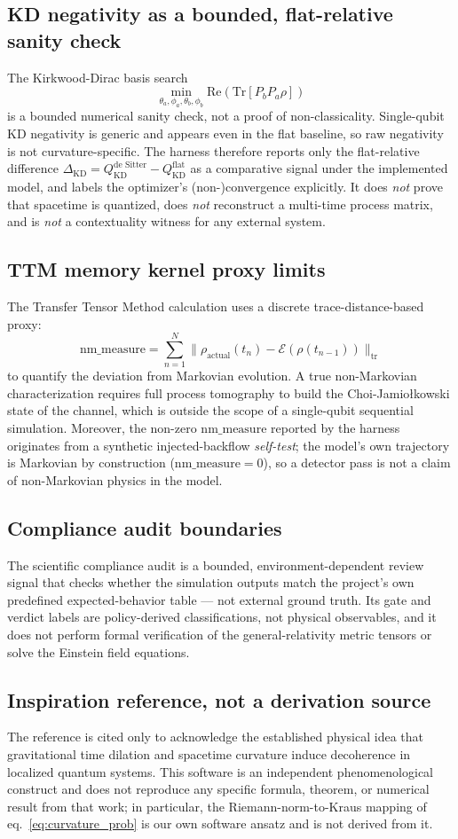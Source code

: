 \subsection{KD negativity as a bounded, flat-relative sanity check}
The Kirkwood-Dirac basis search
$$\min_{\theta_a, \phi_a, \theta_b, \phi_b} \text{Re}\left(\text{Tr}[P_b P_a \rho]\right)$$
is a bounded numerical sanity check, not a proof of non-classicality. Single-qubit KD negativity is generic and appears even in the flat baseline, so raw negativity is not curvature-specific. The harness therefore reports only the flat-relative difference $\Delta_{\text{KD}} = Q^{\text{de Sitter}}_{\text{KD}} - Q^{\text{flat}}_{\text{KD}}$ as a comparative signal under the implemented model, and labels the optimizer's (non-)convergence explicitly. It does \emph{not} prove that spacetime is quantized, does \emph{not} reconstruct a multi-time process matrix, and is \emph{not} a contextuality witness for any external system.

\subsection{TTM memory kernel proxy limits}
The Transfer Tensor Method calculation uses a discrete trace-distance-based proxy:
$$\text{nm\_measure} = \sum_{n=1}^N \|\rho_{\text{actual}}(t_n) - \mathcal{E}(\rho(t_{n-1}))\|_{\text{tr}}$$
to quantify the deviation from Markovian evolution. A true non-Markovian characterization requires full process tomography to build the Choi-Jamio{\l}kowski state of the channel, which is outside the scope of a single-qubit sequential simulation. Moreover, the non-zero $\text{nm\_measure}$ reported by the harness originates from a synthetic injected-backflow \emph{self-test}; the model's own trajectory is Markovian by construction ($\text{nm\_measure} = 0$), so a detector pass is not a claim of non-Markovian physics in the model.

\subsection{Compliance audit boundaries}
The scientific compliance audit is a bounded, environment-dependent review signal that checks whether the simulation outputs match the project's own predefined expected-behavior table --- not external ground truth. Its gate and verdict labels are policy-derived classifications, not physical observables, and it does not perform formal verification of the general-relativity metric tensors or solve the Einstein field equations.

\subsection{Inspiration reference, not a derivation source}
The reference \cite{Pikovski2015} is cited only to acknowledge the established physical idea that gravitational time dilation and spacetime curvature induce decoherence in localized quantum systems. This software is an independent phenomenological construct and does not reproduce any specific formula, theorem, or numerical result from that work; in particular, the Riemann-norm-to-Kraus mapping of eq.~\eqref{eq:curvature_prob} is our own software ansatz and is not derived from it.
